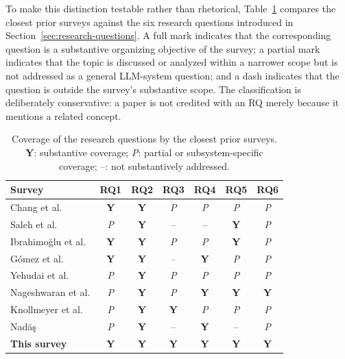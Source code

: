 To make this distinction testable rather than rhetorical, Table~\ref{tab:survey-rq-coverage} compares the closest prior surveys against the six research questions introduced in Section~\ref{sec:research-questions}. A full mark indicates that the corresponding question is a substantive organizing objective of the survey; a partial mark indicates that the topic is discussed or analyzed within a narrower scope but is not addressed as a general LLM-system question; and a dash indicates that the question is outside the survey's substantive scope. The classification is deliberately conservative: a paper is not credited with an RQ merely because it mentions a related concept.

\begin{table}[t]
\centering
\small
\caption{Coverage of the research questions by the closest prior surveys. \textbf{Y}: substantive coverage; \textit{P}: partial or subsystem-specific coverage; --: not substantively addressed.}
\label{tab:survey-rq-coverage}
\begin{tabular}{p{}cccccc}
\toprule
\textbf{Survey} & \textbf{RQ1} & \textbf{RQ2} & \textbf{RQ3} & \textbf{RQ4} & \textbf{RQ5} & \textbf{RQ6} \\
\midrule
Chang et al. \cite{chang2024evaluation} & \textbf{Y} & \textbf{Y} & \textit{P} & \textit{P} & \textit{P} & \textit{P} \\
Saleh et al. \cite{saleh2025evaluating} & \textit{P} & \textbf{Y} & -- & -- & \textbf{Y} & \textit{P} \\
Ibrahimo\u{g}lu et al. \cite{ibrahimoglu2026systematic} & \textbf{Y} & \textbf{Y} & \textit{P} & \textit{P} & \textbf{Y} & \textit{P} \\
G\'{o}mez et al. \cite{gomez2026benchmarks} & \textbf{Y} & \textbf{Y} & -- & \textbf{Y} & \textit{P} & \textit{P} \\
Yehudai et al. \cite{yehudai2026surveyagents} & \textit{P} & \textbf{Y} & \textit{P} & \textit{P} & \textit{P} & \textit{P} \\
Nageshwaran et al. \cite{nageshwaran2026agent} & \textit{P} & \textbf{Y} & \textit{P} & \textbf{Y} & \textbf{Y} & \textbf{Y} \\
Knollmeyer et al. \cite{knollmeyer2026rag} & \textit{P} & \textbf{Y} & \textbf{Y} & \textit{P} & \textit{P} & \textit{P} \\
Nad\u{a}\c{s} \cite{nadas2026judges} & \textit{P} & \textbf{Y} & -- & \textbf{Y} & -- & \textit{P} \\
\midrule
\textbf{This survey} & \textbf{Y} & \textbf{Y} & \textbf{Y} & \textbf{Y} & \textbf{Y} & \textbf{Y} \\
\bottomrule
\end{tabular}
\end{table}

